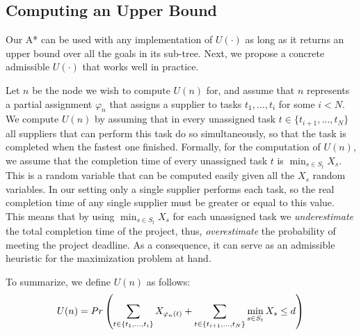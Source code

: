 \documentclass[letterpaper]{article} %
\newcommand{\astar}{\textsc{A*}\xspace}
\begin{document}
\subsection{Computing an Upper Bound}
\label{sec:ubound}

Our \astar can be used with any implementation of $U(\cdot)$ as long as it %
returns an upper bound over all the goals in its sub-tree. Next, we propose a concrete admissible $U(\cdot)$ that works well in practice. %

Let $n$ be the node we wish to compute $U(n)$ for, and assume that $n$ represents a partial assignment $\varphi_n$ that assigns a supplier to tasks $t_1,\ldots, t_i$ for some $i<N$. 
We compute $U(n)$ by assuming that in every unassigned task $t\in \{t_{i+1},\ldots,t_{N}\}$ 
all suppliers that can perform this task do so simultaneously, so that the task is completed 
when the fastest one finished. Formally, for the computation of $U(n)$, we assume that the completion time of every unassigned task $t$ is $\min_{s\in S_t} X_s$. This is a random variable that can be computed easily given all the $X_s$ random variables. 
In our setting only a single supplier performs each task, so the real completion time of any single supplier must be greater or equal to this value. This means that by using $\min_{s\in S_t} X_s$ for each unassigned task we \emph{underestimate} the total completion time of the project, thus, \emph{overestimate} the probability of meeting the project deadline. As a consequence, it can serve as an admissible heuristic for the maximization problem at hand.

To summarize, we define $U(n)$ as follows:
\begin{equation}
\small
U(n)=Pr\left(\sum_{t\in \{t_1,\ldots, t_i\}} X_{\varphi_n(t)} + \sum_{t\in \{t_{i+1},\ldots, t_{N}\}} \min_{s\in S_t} X_s\leq d \right)
\label{eq:heuristic}
\end{equation}

\end{document}
